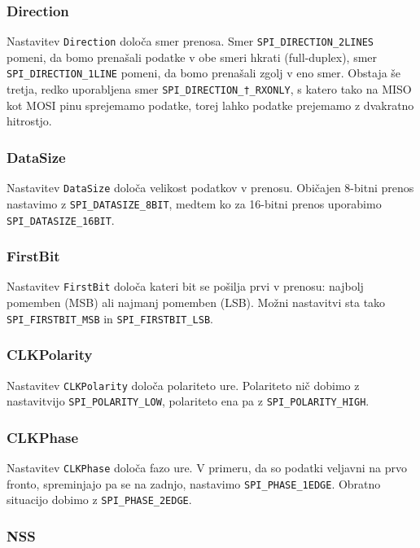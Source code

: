 \documentclass[12pt,letterpaper]{article}
\begin{document}
\subsubsection*{Direction}

Nastavitev \texttt{Direction} določa smer prenosa.  Smer \texttt{SPI\_DIRECTION\_2LINES} pomeni, da bomo prenašali podatke v obe smeri hkrati (full-duplex), smer \texttt{SPI\_DIRECTION\_1LINE} pomeni, da bomo prenašali zgolj v eno smer. Obstaja še tretja, redko uporabljena smer \texttt{SPI\_DIRECTION\_†\_RXONLY}, s katero tako na MISO kot MOSI pinu sprejemamo podatke, torej lahko podatke prejemamo z dvakratno hitrostjo.

\subsubsection*{DataSize}

Nastavitev \texttt{DataSize} določa velikost podatkov v prenosu. Običajen 8-bitni prenos nastavimo z \texttt{SPI\_DATASIZE\_8BIT}, medtem ko za 16-bitni prenos uporabimo \texttt{SPI\_DATASIZE\_16BIT}.

\subsubsection*{FirstBit}

Nastavitev \texttt{FirstBit} določa kateri bit se pošilja prvi v prenosu: najbolj pomemben (MSB) ali najmanj pomemben (LSB). Možni nastavitvi sta tako \texttt{SPI\_FIRSTBIT\_MSB} in \texttt{SPI\_FIRSTBIT\_LSB}.

\subsubsection*{CLKPolarity}

Nastavitev \texttt{CLKPolarity} določa polariteto ure. Polariteto nič dobimo z nastavitvijo \texttt{SPI\_POLARITY\_LOW}, polariteto ena pa z \texttt{SPI\_POLARITY\_HIGH}.

\subsubsection*{CLKPhase}

Nastavitev \texttt{CLKPhase} določa fazo ure. V primeru, da so podatki veljavni na prvo fronto, spreminjajo pa se na zadnjo, nastavimo \texttt{SPI\_PHASE\_1EDGE}. Obratno situacijo dobimo z \texttt{SPI\_PHASE\_2EDGE}.

\subsubsection*{NSS}
\end{document}
